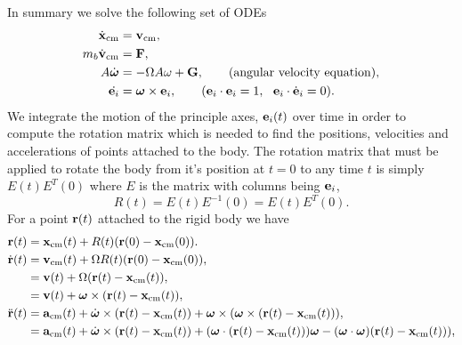 In summary we solve the following set of ODEs
\begin{align}
   \dot{\mathbf{ x}}_{\rm cm} &= \mathbf{ v}_{\rm cm} , \label{eq:rigidBodyX} \\
   m_{b} \dot{\mathbf{ v}}_{\rm cm} &= \mathbf{ F} , \label{eq:rigidBodyV} \\
   A \dot {\boldsymbol{\omega}} &= - \Omega A \omega + \mathbf{ G} , \qquad \text{(angular velocity equation)}, \label{eq:angularVelocity} \\
  \dot{\mathbf{ e}_i} &= \boldsymbol{\omega}\times\mathbf{ e}_i, \qquad (\mathbf{ e}_i\cdot\mathbf{ e}_i=1, ~~\mathbf{ e}_i\cdot\dot{\mathbf{ e}}_i=0)\label{eq:rigidBodyE}.
\end{align}
We integrate the motion of the principle axes, $\mathbf{ e}_i(t)$ over time in order to compute
the rotation matrix which is needed to find the positions, velocities and accelerations
of points attached to the body.
The rotation matrix that must be applied to rotate the body from it's position at $t=0$ to
any time $t$  is simply $E(t)E^T(0)$ where $E$ is the matrix
with columns being $\mathbf{ e}_i$,
\[
   R(t) = E(t) E^{-1}(0) = E(t)E^T(0).
\]
For a point $\mathbf{ r}(t)$ attached to the rigid body we have
\begin{align}
    \mathbf{ r}(t) &= \mathbf{ x}_{\rm cm}(t) + R(t) (\mathbf{ r}(0)-\mathbf{ x}_{\rm cm}(0)) .   \\
    \dot{\mathbf{ r}}(t) &= \mathbf{ v}_{\rm cm}(t) +\Omega R(t) (\mathbf{ r}(0)-\mathbf{ x}_{\rm cm}(0)) ,\\
               &= \mathbf{ v}(t) +\Omega (\mathbf{ r}(t)-\mathbf{ x}_{\rm cm}(t)) , \\
               &= \mathbf{ v}(t) +\boldsymbol{\omega}\times(\mathbf{ r}(t)-\mathbf{ x}_{\rm cm}(t)),\\
    \ddot{\mathbf{ r}}(t) &= \mathbf{ a}_{\rm cm}(t) + \dot{\boldsymbol{\omega}}\times(\mathbf{ r}(t)-\mathbf{ x}_{\rm cm}(t)) + \boldsymbol{\omega}\times(\boldsymbol{\omega}\times(\mathbf{ r}(t)-\mathbf{ x}_{\rm cm}(t))), \\
                &= \mathbf{ a}_{\rm cm}(t) + \dot{\boldsymbol{\omega}}\times(\mathbf{ r}(t)-\mathbf{ x}_{\rm cm}(t)) + (\boldsymbol{\omega}\cdot(\mathbf{ r}(t)-\mathbf{ x}_{\rm cm}(t)))\boldsymbol{\omega} - (\boldsymbol{\omega}\cdot\boldsymbol{\omega})(\mathbf{ r}(t)-\mathbf{ x}_{\rm cm}(t))), 
\end{align}



